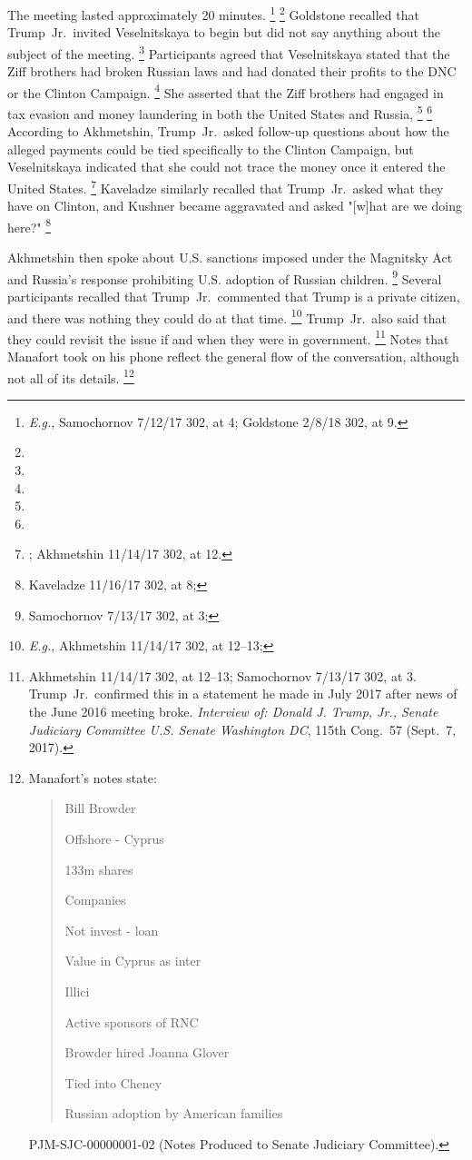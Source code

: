 The meeting lasted approximately 20 minutes.%
\footnote{\textit{E.g.}, Samochornov 7/12/17 302, at 4; Goldstone 2/8/18 302, at 9.}
\footnote{}
 Goldstone recalled that Trump~Jr.\ invited Veselnitskaya to begin but did not say anything about the subject of the meeting.%
\footnote{}
Participants agreed that Veselnitskaya stated that the Ziff brothers had broken Russian laws and had donated their profits to the DNC or the Clinton Campaign.%
\footnote{}
She asserted that the Ziff brothers had engaged in tax evasion and money laundering in both the United States and Russia,%
\footnote{}
\footnote{}
According to Akhmetshin, Trump~Jr.\ asked follow-up questions about how the alleged payments could be tied specifically to the Clinton Campaign, but Veselnitskaya indicated that she could not trace the money once it entered the United States.%
\footnote{; Akhmetshin 11/14/17 302, at 12.}
Kaveladze similarly recalled that Trump~Jr.\ asked what they have on Clinton, and Kushner became aggravated and asked "[w]hat are we doing here?"%
\footnote{Kaveladze 11/16/17 302, at 8;
}

Akhmetshin then spoke about U.S. sanctions imposed under the Magnitsky Act and Russia's response prohibiting U.S. adoption of Russian children.%
\footnote{Samochornov 7/13/17 302, at 3;
}
Several participants recalled that Trump~Jr.\ commented that Trump is a private citizen, and there was nothing they could do at that time.%
\footnote{\textit{E.g.}, Akhmetshin 11/14/17 302, at 12--13;
}
Trump~Jr.\ also said that they could revisit the issue if and when they were in government.%
\footnote{Akhmetshin 11/14/17 302, at 12--13;
Samochornov 7/13/17 302, at 3.
Trump~Jr.\ confirmed this in a statement he made in July 2017 after news of the June 2016 meeting broke.
\textit{Interview of: Donald J. Trump, Jr., Senate Judiciary Committee U.S. Senate Washington DC}, 115th Cong.~57 (Sept.~7, 2017).}
Notes that Manafort took on his phone reflect the general flow of the conversation, although not all of its details.%
\footnote{Manafort's notes state:

\begin{quote}
Bill Browder

Offshore - Cyprus

133m shares

Companies

Not invest - loan

Value in Cyprus as inter

Illici

Active sponsors of RNC

Browder hired Joanna Glover

Tied into Cheney

Russian adoption by American families
\end{quote}

PJM-SJC-00000001-02 (Notes Produced to Senate Judiciary Committee).}

